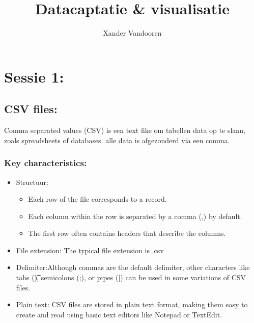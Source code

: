 \documentclass[12pt]{article}
\begin{document}
\begin{titlepage}
    \author{Xander Vandooren}
    \title{Datacaptatie \& visualisatie}
\end{titlepage}
\maketitle
\newpage
\tableofcontents
\newpage
{}
\section{Sessie 1:}
\subsection{CSV files:}
Comma separated values (CSV) is een text fike om tabellen data op te slaan, zoals spreadsheets of databases. alle data is afgezonderd via een comma.
\subsubsection{Key characteristics:}
\begin{itemize}
    \item Structuur:\begin{itemize}
        \item Each row of the file corresponds to a record.
        \item Each column within the row is separated by a comma (,) by default.
        \item The first row often contains headers that describe the columns.
    \end{itemize}
    \item File extension: The typical file extension is .csv    
    \item Delimiter:Although commas are the default delimiter, other characters like tabs (\t), semicolons (;), or pipes (|) can be used in some variations of CSV files.
    \item Plain text: CSV files are stored in plain text format, making them easy to create and read using basic text editors like Notepad or TextEdit.
\end{itemize}
\end{document}
